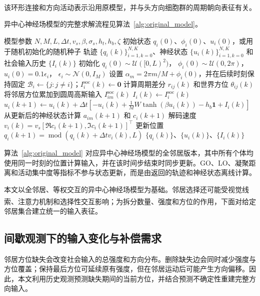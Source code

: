 \documentclass[UTF8,fontset=windows,11pt]{ctexart}
\newcommand{\upcite}[1]{\textsuperscript{\cite{#1}}}
\begin{document}
该环形连接和方向活动表示沿用原模型，并与头方向细胞群的周期朝向表征有关\upcite{Zhang1996}。

异中心神经场模型的完整求解流程见算法~\ref{alg:original_model}。

\begin{algorithm}[!tbp]
 \caption{异中心神经场模型的求解流程}
 \label{alg:original_model}
 \begin{algorithmic}[1]
 \Require 模型参数 $N,M,L,\Delta t,v_s,\beta,\sigma_s,h_t,h_b,\zeta$
 \Require 初始状态 $q_i(0)$、$\phi_i(0)$、$u_i(0)$，或用于随机初始化的随机种子
 \Ensure 轨迹 $\{q_i(k)\}_{i=1,k=0}^{N,K}$、神经状态 $\{u_i(k)\}_{i=1,k=0}^{N,K}$ 和社会输入历史 $\{I_i(k)\}$
 \State 初始化
 $q_i(0)\sim\mathcal U([0,L)^2)$，
 $\phi_i(0)\sim\mathcal U(0,2\pi)$，
 $u_i(0)=0.1\epsilon_i$，
 $\epsilon_i\sim\mathcal N(0,I_M)$
 \State 设置 $\alpha_m=2\pi m/M+\phi_i(0)$，并在后续时刻保持固定
   \State $\mathcal B_i\leftarrow\{j:j\ne i\}$；$I_i^{\mathrm{soc}}(k)\leftarrow\mathbf 0$
    \State 计算周期差分 $r_{ij}(k)$ 和世界方位 $\theta_{ij}(k)$
    \State 将邻居方位累加到圆周高斯输入 $I^{\mathrm{soc}}_{im}(k)$
   \EndFor
   \State $I_i(k)\leftarrow I^{\mathrm{soc}}_{i}(k)$
   \State $u_i(k+1)\leftarrow
   u_i(k)+\Delta t\left[-u_i(k)+\frac{1}{M}W\tanh(\beta u_i(k))-h_b\mathbf 1+I_i(k)\right]$
   \State 从更新后的神经状态计算 $a_{im}(k+1)$ 和 $c_i(k+1)$
   \State 解码速度 $v_i(k)=v_s[\Re c_i(k+1),\Im c_i(k+1)]^\top$
  \EndFor
   \State 更新位置 $q_i(k+1)=\operatorname{mod}(q_i(k)+\Delta t v_i(k),L)$
  \EndFor
 \EndFor
 \State \Return $\{q_i(k)\}$、$\{u_i(k)\}$、$\{I_i(k)\}$
 \end{algorithmic}
\end{algorithm}

算法~\ref{alg:original_model} 对应异中心神经场模型的全邻居版本，其中所有个体均使用同一时刻的位置计算输入，并在该时间步结束时同步更新。GO、LO、凝聚距离和活动集中度等指标不参与状态更新，而是由返回的轨迹和神经状态离线计算。

本文以全邻居、等权交互的异中心神经场模型为基础。邻居选择还可能受视觉线索\upcite{Krongauz2024}、注意力机制\upcite{Li2024}和选择性交互\upcite{Xue2025}影响；为拆分数量、强度和方位的作用，下面对给定邻居集合建立统一的输入表征。


\subsection{间歇观测下的输入变化与补偿需求}
邻居方位缺失会改变社会输入的总强度和方向分布。删除缺失边会同时减少强度与方位覆盖；保持最后方位可延续原有强度，但在邻居运动后可能产生方向偏移。因此，本文利用历史观测预测缺失期间的当前方位，并结合预测不确定性重建完整方向输入。
\end{document}
